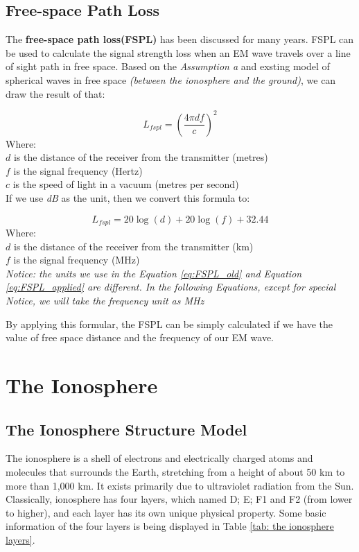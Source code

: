\documentclass{mcmthesis}
\begin{document}
  \subsection{Free-space Path Loss}
      The \textbf{free-space path loss(FSPL)}\cite{freespacepathloss} has been discussed for many years. FSPL can be used to calculate the signal strength loss when an EM wave travels over a line of sight path in free space. Based on the \emph{Assumption a} and exsting model of spherical waves in free space \emph{(between the ionosphere and the ground)}, we can draw the result of that:

        \begin{equation}\label{eq:FSPL_old}
          L_{fspl} = (\frac{4 \pi d f}{c})^{2}
        \end{equation}
        Where: \\
        $d$ is the distance of the receiver from the transmitter (metres)\\
        $f$ is the signal frequency (Hertz)\\
        $c$ is the speed of light in a vacuum (metres per second)\\

      If we use \emph{dB} as the unit, then we convert this formula to:

        \begin{equation}\label{eq:FSPL_applied}
          L_{fspl} = 20\log(d) + 20\log(f) + 32.44
        \end{equation}
        Where:\\
        $d$ is the distance of the receiver from the transmitter (km)\\
        $f$ is the signal frequency (MHz)\\

      \emph{Notice: the units we use in the Equation \ref{eq:FSPL_old} and Equation \ref{eq:FSPL_applied} are different. In the following Equations, except for special Notice, we will take the frequency unit as MHz}

      By applying this formular, the FSPL can be simply calculated if we have the value of free space distance and the frequency of our EM wave.

\section{The Ionosphere}

  \subsection{The Ionosphere Structure Model}
    The ionosphere is a shell of electrons and electrically charged atoms and molecules that surrounds the Earth, stretching from a height of about 50 km to more than 1,000 km. It exists primarily due to ultraviolet radiation from the Sun. Classically, ionosphere has four layers, which named D; E; F1 and F2 (from lower to higher), and each layer has its own unique physical property.\cite{davies1990ionospheric} Some basic information of the four layers is being displayed in Table \ref{tab: the ionosphere layers}.
\end{document}

